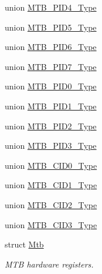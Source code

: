 \begin{DoxyCompactItemize}
\item 
union \mbox{\hyperlink{union_m_t_b___p_i_d4___type}{M\+T\+B\+\_\+\+P\+I\+D4\+\_\+\+Type}}
\item 
union \mbox{\hyperlink{union_m_t_b___p_i_d5___type}{M\+T\+B\+\_\+\+P\+I\+D5\+\_\+\+Type}}
\item 
union \mbox{\hyperlink{union_m_t_b___p_i_d6___type}{M\+T\+B\+\_\+\+P\+I\+D6\+\_\+\+Type}}
\item 
union \mbox{\hyperlink{union_m_t_b___p_i_d7___type}{M\+T\+B\+\_\+\+P\+I\+D7\+\_\+\+Type}}
\item 
union \mbox{\hyperlink{union_m_t_b___p_i_d0___type}{M\+T\+B\+\_\+\+P\+I\+D0\+\_\+\+Type}}
\item 
union \mbox{\hyperlink{union_m_t_b___p_i_d1___type}{M\+T\+B\+\_\+\+P\+I\+D1\+\_\+\+Type}}
\item 
union \mbox{\hyperlink{union_m_t_b___p_i_d2___type}{M\+T\+B\+\_\+\+P\+I\+D2\+\_\+\+Type}}
\item 
union \mbox{\hyperlink{union_m_t_b___p_i_d3___type}{M\+T\+B\+\_\+\+P\+I\+D3\+\_\+\+Type}}
\item 
union \mbox{\hyperlink{union_m_t_b___c_i_d0___type}{M\+T\+B\+\_\+\+C\+I\+D0\+\_\+\+Type}}
\item 
union \mbox{\hyperlink{union_m_t_b___c_i_d1___type}{M\+T\+B\+\_\+\+C\+I\+D1\+\_\+\+Type}}
\item 
union \mbox{\hyperlink{union_m_t_b___c_i_d2___type}{M\+T\+B\+\_\+\+C\+I\+D2\+\_\+\+Type}}
\item 
union \mbox{\hyperlink{union_m_t_b___c_i_d3___type}{M\+T\+B\+\_\+\+C\+I\+D3\+\_\+\+Type}}
\item 
struct \mbox{\hyperlink{struct_mtb}{Mtb}}
\begin{DoxyCompactList}\small\item\em M\+TB hardware registers. \end{DoxyCompactList}\end{DoxyCompactItemize}
